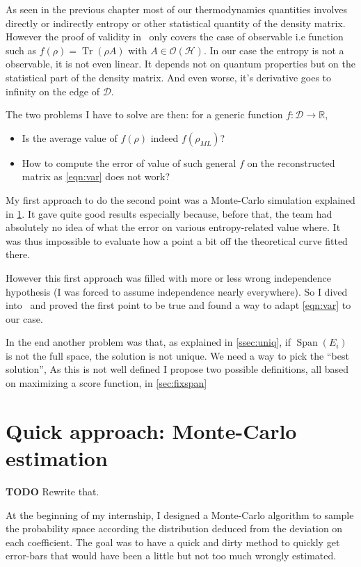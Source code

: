 \documentclass[10pt,a4paper]{report}
\theoremstyle{plain}
\theoremstyle{definition}
\theoremstyle{remark}
\newcommand{\R}{\ensuremath{\mathbb{R}}}
\newcommand{\TODO}{\textbf{TODO}}
\DeclareMathOperator{\Tr}{Tr}
\DeclareMathOperator{\Span}{Span}
\newcommand{\ml}{_{M\!L}}
\begin{document}
As seen in the previous chapter most of our thermodynamics quantities involves
directly or indirectly entropy or other statistical quantity of the density
matrix. However the proof of validity in~\cite{SPRAL17} only covers the case of
observable i.e function such as $f(\rho) = \Tr(\rho A)$ with $A \in
\mathcal{O}(\mathcal{H})$. In our case the entropy is not a observable, it is not even
linear. It depends not on quantum properties but on the statistical part of the
density matrix. And even worse, it's derivative goes to infinity on the edge of
$\mathcal{D}$.

The two problems I have to solve are then:
for a generic function $f : \mathcal{D}
\to \R$,
\begin{itemize}
\item Is the average value of $f(\rho)$ indeed $f(\rho\ml)$?
\item How to compute the error of value of such general $f$ on the reconstructed
  matrix as \cref{eqn:var} does not work?
\end{itemize}

My first approach to do the second point was a Monte-Carlo simulation
explained in \cref{sec:MC}. It gave quite good results especially because,
before that, the team had absolutely no idea of what the error on various
entropy-related value where. It was thus impossible to evaluate how a point a
bit off the theoretical curve fitted there.

However this first approach was filled with more or less wrong independence
hypothesis (I was forced to assume independence nearly everywhere). So I dived
into~\cite{SPRAL17} and proved the first point to be true and found a way to
adapt \cref{eqn:var} to our case.

In the end another problem was that, as explained in \cref{ssec:uniq}, if
$\Span(E_i)$ is not the full space, the solution is not unique. We need a way to
pick the ``best solution'', As this is not well defined I propose two possible
definitions, all based on maximizing a score function, in \cref{sec:fixspan}

\section{Quick approach: Monte-Carlo estimation}\label{sec:MC}

\TODO{} Rewrite that.

At the beginning of my internship, I designed a Monte-Carlo algorithm to sample
the probability space according the distribution deduced from the deviation on
each coefficient. The goal was to have a quick and dirty method to quickly get
error-bars that would have been a little but not too much wrongly estimated.
\end{document}

